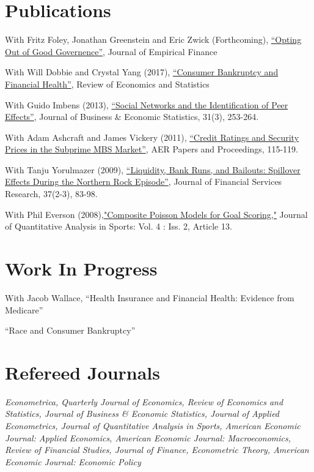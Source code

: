 \documentclass[letterpaper]{article}
\renewenvironment{itemize}{
  \begin{list}{}
    { \setlength{\itemsep}{5pt}
      \setlength{\parsep}{0pt}
      \setlength{\topsep}{0pt}
      \setlength{\leftmargin}{0em} } }{
  \end{list}}
\begin{document}
\section*{Publications}

\begin{itemize}
\item With Fritz Foley, Jonathan Greenstein and Eric Zwick (Forthcoming), \href{http://www.nber.org/papers/w19953}{``Opting Out of Good Governence''}, Journal of Empirical Finance
\item With Will Dobbie and Crystal Yang (2017), \href{http://www.nber.org/papers/w21032}{``Consumer Bankruptcy and Financial Health''}, Review of Economics and Statistics
\item With Guido Imbens (2013), \href{http://www.tandfonline.com/doi/pdf/10.1080/07350015.2013.801251}{``Social Networks and the Identification of Peer Effects''}, Journal of Business \& Economic Statistics, 31(3), 253-264.
\item With Adam Ashcraft and James Vickery (2011), \href{http://papers.ssrn.com.ezp-prod1.hul.harvard.edu/sol3/papers.cfm?abstract_id=1856823}{``Credit Ratings
    and Security Prices in the Subprime MBS Market''}, AER Papers and Proceedings,  115-119. 
\item With Tanju Yorulmazer (2009), \href{http://www.springerlink.com/content/ww187761jgr660q5/}{``Liquidity, Bank Runs, and Bailouts: Spillover Effects During the Northern Rock Episode''}, Journal of Financial Services Research, 37(2-3), 83-98. 
\item With Phil Everson (2008),\href{http://www.bepress.com/jqas/vol4/iss2/13/}{"Composite Poisson Models for Goal Scoring,"} Journal of Quantitative Analysis in Sports: Vol. 4 : Iss. 2, Article 13.
\end{itemize}


\section*{Work In Progress}
\begin{itemize}
\item With Jacob Wallace, ``Health Insurance and Financial Health: Evidence from Medicare''
\item ``Race and Consumer Bankruptcy'' 
\end{itemize}


\section*{Refereed Journals}
\textit{Econometrica, Quarterly Journal of Economics, Review of Economics and Statistics, Journal of Business \& Economic Statistics, Journal of Applied Econometrics, Journal of Quantitative Analysis in Sports, American Economic Journal: Applied Economics, American Economic Journal: Macroeconomics, Review of Financial Studies, Journal of Finance, Econometric Theory, American Economic Journal: Economic Policy}
\end{document}

